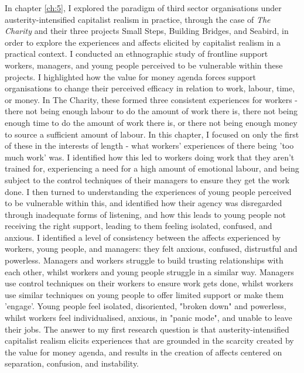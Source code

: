 In chapter \ref{ch:5}, I explored the paradigm of third sector organisations under austerity-intensified capitalist realism in practice, through the case of \textit{The Charity} and their three projects Small Steps, Building Bridges, and Seabird, in order to explore the experiences and affects elicited by capitalist realism in a practical context. I conducted an ethnographic study of frontline support workers, managers, and young people perceived to be vulnerable within these projects. I highlighted how the value for money agenda forces support organisations to change their perceived efficacy in relation to work, labour, time, or money. In The Charity, these formed three consistent experiences for workers - there not being enough labour to do the amount of work there is, there not being enough time to do the amount of work there is, or there not being enough money to source a sufficient amount of labour. In this chapter, I focused on only the first of these in the interests of length - what workers' experiences of there being 'too much work' was. I identified how this led to workers doing work that they aren't trained for, experiencing a need for a high amount of emotional labour, and being subject to the control techniques of their managers to ensure they get the work done. I then turned to understanding the experiences of young people perceived to be vulnerable within this, and identified how their agency was disregarded through inadequate forms of listening, and how this leads to young people not receiving the right support, leading to them feeling isolated, confused, and anxious. I identified a level of consistency between the affects experienced by workers, young people, and managers: they felt anxious, confused, distrustful and powerless. Managers and workers struggle to build trusting relationships with each other, whilst workers and young people struggle in a similar way. Managers use control techniques on their workers to ensure work gets done, whilst workers use similar techniques on young people to offer limited support or make them 'engage'. Young people feel isolated, disoriented, "broken down" and powerless, whilst workers feel individualised, anxious, in "panic mode", and unable to leave their jobs. The answer to my first research question is that austerity-intensified capitalist realism elicits experiences that are grounded in the scarcity created by the value for money agenda, and results in the creation of affects centered on separation, confusion, and instability.

